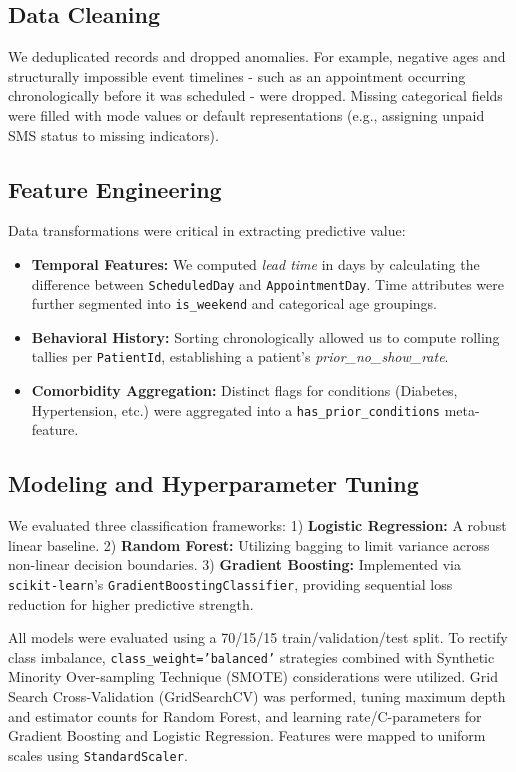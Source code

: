 \documentclass[conference]{IEEEtran}
\begin{document}
\subsection{Data Cleaning}
We deduplicated records and dropped anomalies. For example, negative ages and structurally impossible event timelines - such as an appointment occurring chronologically before it was scheduled - were dropped. Missing categorical fields were filled with mode values or default representations (e.g., assigning unpaid SMS status to missing indicators).

\subsection{Feature Engineering}
Data transformations were critical in extracting predictive value:
\begin{itemize}
    \item \textbf{Temporal Features:} We computed \textit{lead time} in days by calculating the difference between \texttt{ScheduledDay} and \texttt{AppointmentDay}. Time attributes were further segmented into \texttt{is\_weekend} and categorical age groupings.
    \item \textbf{Behavioral History:} Sorting chronologically allowed us to compute rolling tallies per \texttt{PatientId}, establishing a patient's \textit{prior\_no\_show\_rate}. 
    \item \textbf{Comorbidity Aggregation:} Distinct flags for conditions (Diabetes, Hypertension, etc.) were aggregated into a \texttt{has\_prior\_conditions} meta-feature.
\end{itemize}

\subsection{Modeling and Hyperparameter Tuning}
We evaluated three classification frameworks:
1) \textbf{Logistic Regression:} A robust linear baseline.
2) \textbf{Random Forest:} Utilizing bagging to limit variance across non-linear decision boundaries.
3) \textbf{Gradient Boosting:} Implemented via \texttt{scikit-learn}'s \texttt{GradientBoostingClassifier}, providing sequential loss reduction for higher predictive strength.

All models were evaluated using a 70/15/15 train/validation/test split. To rectify class imbalance, \texttt{class\_weight='balanced'} strategies combined with Synthetic Minority Over-sampling Technique (SMOTE) considerations were utilized. Grid Search Cross-Validation (GridSearchCV) was performed, tuning maximum depth and estimator counts for Random Forest, and learning rate/C-parameters for Gradient Boosting and Logistic Regression. Features were mapped to uniform scales using \texttt{StandardScaler}.
\end{document}
